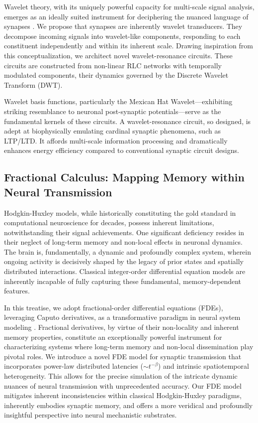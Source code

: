 \documentclass{article}
\begin{document}
Wavelet theory, with its uniquely powerful capacity for multi-scale signal analysis, emerges as an ideally suited instrument for deciphering the nuanced language of synapses \cite{Daubechies1992}. We propose that synapses are inherently wavelet transducers. They decompose incoming signals into wavelet-like components, responding to each constituent independently and within its inherent scale. Drawing inspiration from this conceptualization, we architect novel wavelet-resonance circuits. These circuits are constructed from non-linear RLC networks with temporally modulated components, their dynamics governed by the Discrete Wavelet Transform (DWT).

Wavelet basis functions, particularly the Mexican Hat Wavelet—exhibiting striking resemblance to neuronal post-synaptic potentials—serve as the fundamental kernels of these circuits. A wavelet-resonance circuit, so designed, is adept at biophysically emulating cardinal synaptic phenomena, such as LTP/LTD. It affords multi-scale information processing and dramatically enhances energy efficiency compared to conventional synaptic circuit designs.

\subsection{Fractional Calculus: Mapping Memory within Neural Transmission}

Hodgkin-Huxley models, while historically constituting the gold standard in computational neuroscience for decades, possess inherent limitations, notwithstanding their signal achievements. One significant deficiency resides in their neglect of long-term memory and non-local effects in neuronal dynamics. The brain is, fundamentally, a dynamic and profoundly complex system, wherein ongoing activity is decisively shaped by the legacy of prior states and spatially distributed interactions. Classical integer-order differential equation models are inherently incapable of fully capturing these fundamental, memory-dependent features.

In this treatise, we adopt fractional-order differential equations (FDEs), leveraging Caputo derivatives, as a transformative paradigm in neural system modeling \cite{Podlubny1999}. Fractional derivatives, by virtue of their non-locality and inherent memory properties, constitute an exceptionally powerful instrument for characterizing systems where long-term memory and non-local dissemination play pivotal roles. We introduce a novel FDE model for synaptic transmission that incorporates power-law distributed latencies ($\sim t^{-\beta}$) and intrinsic spatiotemporal heterogeneity. This allows for the precise simulation of the intricate dynamic nuances of neural transmission with unprecedented accuracy. Our FDE model mitigates inherent inconsistencies within classical Hodgkin-Huxley paradigms, inherently embodies synaptic memory, and offers a more veridical and profoundly insightful perspective into neural mechanistic substrates.
\end{document}
